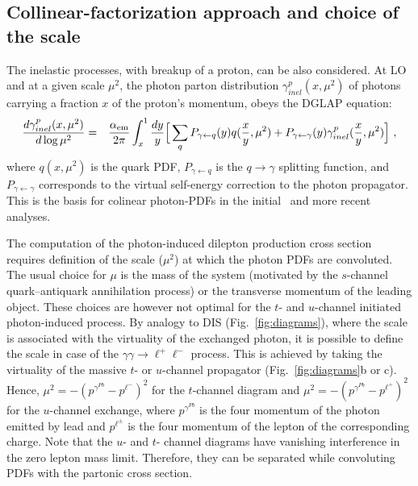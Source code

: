 \subsection{Collinear-factorization approach and choice of the scale}

The inelastic processes, with breakup of a proton, can be also considered.
At LO and at a given scale $\mu^2$, the photon parton distribution $\gamma^p_{inel}(x,\mu^2)$ of photons carrying a fraction $x$ of the proton's momentum, obeys the DGLAP equation:
\begin{eqnarray}
{d \gamma^p_{inel}(x,\mu^2) \over d \log \mu^2} =&& {\alpha_{\rm{em}} \over 2 \pi} \int_x^1 {dy \over y} 
\Big [ \sum_q P_{\gamma \leftarrow q}(y) 
 q ({x \over y}, \mu^2 )   + P_{\gamma \leftarrow \gamma}(y) \gamma^p_{inel}({x \over y},\mu^2) \Big ]~,
\end{eqnarray}
where $q (x,\mu^2)$ is the quark PDF,  $P_{\gamma \leftarrow q}$ is the $q\rightarrow\gamma$ splitting function, and $P_{\gamma \leftarrow \gamma}$ corresponds to the virtual self-energy correction to the photon propagator.
This is the basis for colinear photon-PDFs in the initial~\cite{Gluck:2002fi, Martin:2004dh} and more recent~\cite{Ball:2013hta, Martin:2014nqa, Schmidt:2014aba, Harland-Lang:2016kog, Giuli:2017oii, Manohar:2016nzj, Bertone:2017bme} analyses.

The computation of the photon-induced dilepton production cross section  requires definition of the  scale ($\mu^2$) at which the photon PDFs are convoluted.
The usual choice for $\mu$ is the mass of the system (motivated by the $s$-channel quark--antiquark annihilation process) or the transverse momentum of the leading object. 
These choices are however not optimal for the $t$- and $u$-channel initiated photon-induced process.
By analogy to DIS (Fig.~\ref{fig:diagrams}), where the scale is associated with the virtuality of the exchanged photon,
it is possible to define the scale in case of the $\gamma\gamma\rightarrow\ell^+\ell^-$ process.
This is achieved by taking the virtuality of the massive $t$- or $u$-channel propagator (Fig.~\ref{fig:diagrams}b or c).
Hence, $\mu^2 = -(p^{\gamma^{Pb}}-p^{\ell^-})^2$ for the $t$-channel diagram and $\mu^2 = -(p^{\gamma^{Pb}}-p^{\ell^+})^2$ for the $u$-channel exchange, where $p^{\gamma^{Pb}}$ is the four momentum
of the photon emitted by lead and $p^{\ell^{\pm}}$ is the four momentum of the lepton of the corresponding charge.
Note that the $u$- and $t$- channel diagrams have vanishing interference in the zero lepton mass limit. Therefore, they can be separated  while convoluting PDFs with the partonic cross section.

